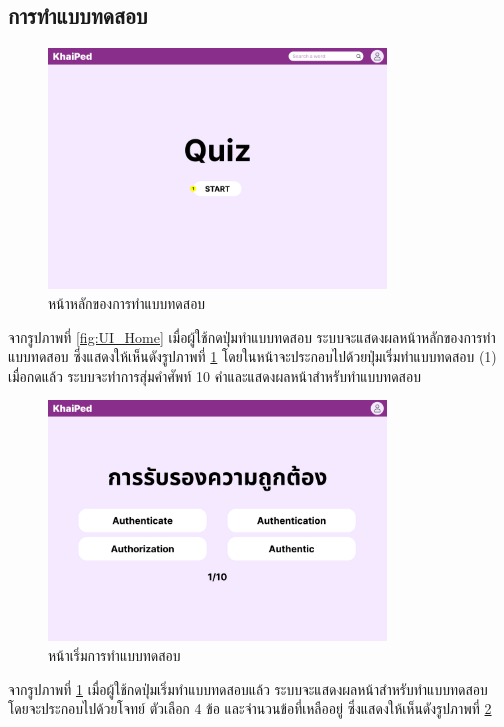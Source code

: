 \documentclass[12pt,oneside,openright,a4paper]{cpe-thai-project}
\begin{document}
\pagebreak
\subsection{การทำแบบทดสอบ}
\begin{figure}[!h]\centering
	\includegraphics[width=0.8\textwidth, keepaspectratio=true]{image/chap3/ui/quiz/Quiz.png}
	\caption{หน้าหลักของการทำแบบทดสอบ}\label{fig:UI_Quiz}
\end{figure}
\hspace{1cm}
จากรูปภาพที่ \ref{fig:UI_Home} เมื่อผู้ใช้กดปุ่มทำแบบทดสอบ ระบบจะแสดงผลหน้าหลักของการทำแบบทดสอบ ซึ่งแสดงให้เห็นดังรูปภาพที่ \ref{fig:UI_Quiz} 
โดยในหน้าจะประกอบไปด้วยปุ่มเริ่มทำแบบทดสอบ (1) เมื่อกดแล้ว ระบบจะทำการสุ่มคำศัพท์ 10 คำและแสดงผลหน้าสำหรับทำแบบทดสอบ


\begin{figure}[!h]\centering
	\includegraphics[width=0.8\textwidth, keepaspectratio=true]{image/chap3/ui/quiz/Quiz - Start.png}
	\caption{หน้าเริ่มการทำแบบทดสอบ}\label{fig:UI_QuizStart}
\end{figure}
\hspace{1cm}
จากรูปภาพที่ \ref{fig:UI_Quiz} เมื่อผู้ใช้กดปุ่มเริ่มทำแบบทดสอบแล้ว ระบบจะแสดงผลหน้าสำหรับทำแบบทดสอบ โดยจะประกอบไปด้วยโจทย์ 
ตัวเลือก 4 ข้อ และจำนวนข้อที่เหลืออยู่ ซึ่งแสดงให้เห็นดังรูปภาพที่ \ref{fig:UI_QuizStart}
\end{document}
